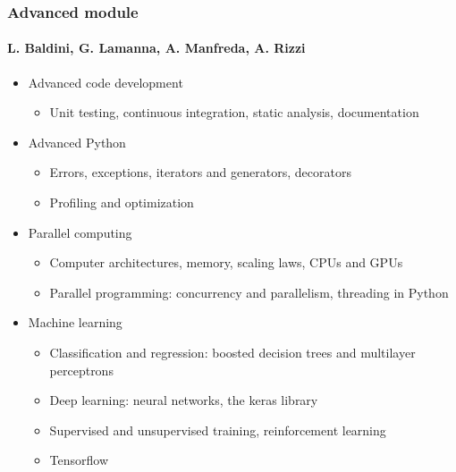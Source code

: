 \documentclass[9pt]{beamer}
\begin{document}
\begin{frame}
  \frametitle{Advanced module}
  \framesubtitle{L. Baldini, G. Lamanna, A. Manfreda, A. Rizzi}
  \begin{itemize}
  \item Advanced code development
    \begin{itemize}
    \item Unit testing, continuous integration, static analysis, documentation
    \end{itemize}
  \item Advanced Python
    \begin{itemize}
    \item Errors, exceptions, iterators and generators, decorators
    \item Profiling and optimization
    \end{itemize}
  \item Parallel computing
    \begin{itemize}
    \item Computer architectures, memory, scaling laws, CPUs and GPUs
    \item Parallel programming: concurrency and parallelism, threading in Python
    \end{itemize}
  \item Machine learning
    \begin{itemize}
    \item Classification and regression: boosted decision trees and
      multilayer perceptrons
    \item Deep learning: neural networks, the keras library
    \item Supervised and unsupervised training, reinforcement learning
    \item Tensorflow
    \end{itemize}    
  \end{itemize}
\end{frame}
\end{document}
